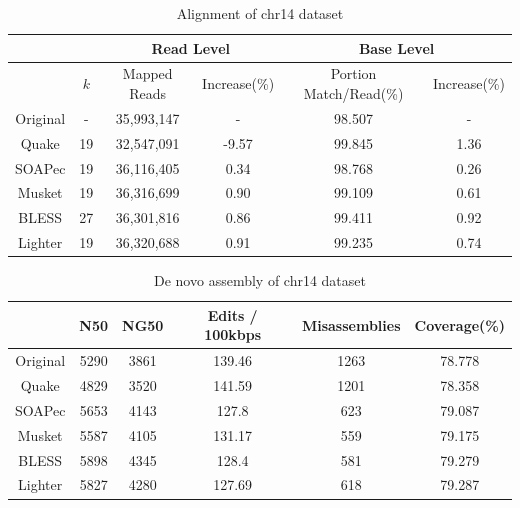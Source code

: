\documentclass{bmcart}
\begin{document}
\begin{backmatter}
\begin{table}[h!]%
\caption{Alignment of chr14 dataset}
\begin{tabular}{|c|c|c|c||c|c|}\hline
  &  & \multicolumn{2}{|c||}{Read Level} & \multicolumn{2}{|c|}{Base Level} \\ \hline
  & $k$ & Mapped Reads  &Increase(\%) & Portion Match/Read(\%)  & Increase(\%) \\ \hline
Original & - & 35,993,147	&- 		&	 98.507 & -\\ \hline
Quake 	& 19 & 32,547,091	& -9.57 &	99.845 & 1.36 \\ \hline
SOAPec  & 19 & 36,116,405  & 0.34 & 98.768 & 0.26 \\ \hline
Musket 	& 19 &	36,316,699	& 0.90	& 99.109 & 0.61 \\ \hline
BLESS 	& 27 &36,301,816	& 0.86	& 99.411 & 0.92 \\ \hline
Lighter	& 19 & 36,320,688 & 0.91	& 99.235 & 0.74 \\ \hline
\end{tabular}
\end{table}

\begin{table}[h!] %
\caption{De novo assembly of chr14 dataset}
\begin{tabular}{|c|c|c|c|c|c|} \hline
	   & N50 &	NG50	& Edits / 100kbps &	Misassemblies	& Coverage(\%) \\ \hline
Original &	5290 & 3861	& 139.46 &1263	& 78.778 \\ \hline
Quake	&	4829 & 3520 & 141.59 & 1201 &	78.358 \\ \hline
SOAPec & 5653	& 4143	& 127.8 &	623	 & 79.087 \\ \hline
Musket	&	5587& 	4105 &	131.17	& 559 &	79.175  \\ \hline
BLESS	&	5898 &	4345 &	128.4	& 581 &	79.279 \\ \hline
Lighter	&	5827 & 4280	& 127.69	& 618 & 79.287 \\ \hline
\end{tabular}
\end{table}


\end{backmatter}
\end{document}
